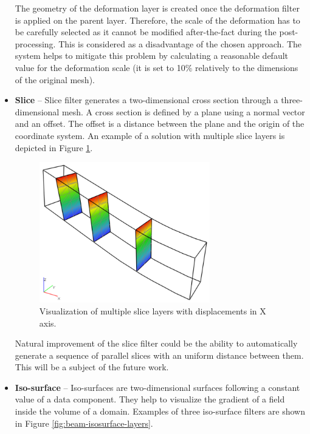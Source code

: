\begin{itemize}
    The geometry of the deformation layer is created once the deformation filter is applied on the parent layer. Therefore, the scale of the deformation has to be carefully selected as it cannot be modified after-the-fact during the post-processing. This is considered as a disadvantage of the chosen approach. The system helps to mitigate this problem by calculating a reasonable default value for the deformation scale (it is set to 10\% relatively to the dimensions of the original mesh).

    \item \textbf{Slice} -- Slice filter generates a two-dimensional cross section through a three-dimensional mesh. A cross section is defined by a plane using a normal vector and an offset. The offset is a distance between the plane and the origin of the coordinate system. An example of a solution with multiple slice layers is depicted in Figure \ref{fig:beam-slice-layers}.
    
    \begin{figure}[H]
        \centering
        \includegraphics[width=0.7\textwidth]{figures/chapter-data-management/beam-slice-layers}
        \decoRule
        \caption[Visualization of multiple slice layers]{Visualization of multiple slice layers with displacements in X axis.}
        \label{fig:beam-slice-layers}
    \end{figure}

    Natural improvement of the slice filter could be the ability to automatically generate a sequence of parallel slices with an uniform distance between them. This will be a subject of the future work.
    
    \item \textbf{Iso-surface} -- Iso-surfaces are two-dimensional surfaces following a constant value of a data component. They help to visualize the gradient of a field inside the volume of a domain. Examples of three iso-surface filters are shown in Figure \ref{fig:beam-isosurface-layers}.
    

\end{itemize}
